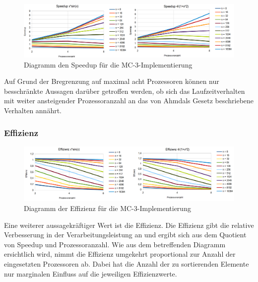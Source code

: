 \documentclass[a4paper,12pt]{scrartcl}
\begin{document}
\begin{figure}[htb]
  \begin{center}
    \includegraphics[width=1\hsize]{../mc3_speeduppercpu.png}
  \end{center}
  \caption{\label{mc3speeduppercpu}
    Diagramm den Speedup f\"ur die MC-3-Implementierung}
\end{figure}
Auf Grund der Bregrenzung auf maximal acht Prozessoren k\"onnen nur besschr\"ankte Aussagen dar\"uber getroffen werden, ob sich das Laufzeitverhalten
mit weiter ansteigender Prozessoranzahl an das von Ahmdals Gesetz beschriebene Verhalten ann\"ahrt.

\subsubsection{Effizienz}
\begin{figure}[htb]
  \begin{center}
    \includegraphics[width=1\hsize]{../mc3_effizienz.png}
  \end{center}
  \caption{\label{mc3effizienz}
    Diagramm der Effizienz f\"ur die MC-3-Implementierung}
\end{figure}
Eine weiterer aussagekräftiger Wert ist die Effizienz.
Die Effizienz gibt die relative Verbesserung in der Verarbeitungsleistung an und ergibt sich aus dem Quotient von Speedup und Prozessoranzahl.
Wie aus dem betreffenden Diagramm ersichtlich wird, nimmt die Effizienz umgekehrt proportional zur Anzahl der eingesetzten
Prozessoren ab. Dabei hat die Anzahl der zu sortierenden Elemente nur marginalen Einfluss auf die jeweiligen Effizienzwerte.
\end{document}

